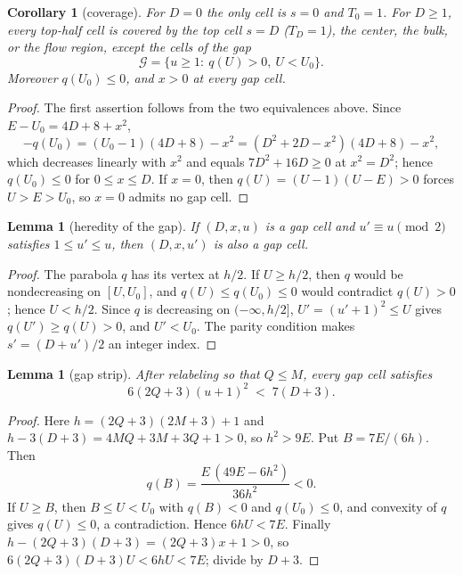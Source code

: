 \documentclass[twoside,10pt]{article}
\numberwithin{equation}{section}
\theoremstyle{slbody}
\newtheorem{lemma}[theorem]{Lemma}
\newtheorem{corollary}[theorem]{Corollary}
\theoremstyle{definition}
\theoremstyle{remark}
\numberwithin{theorem}{section}
\begin{document}
\begin{corollary}[coverage]\label{cor:coverage}
For $D=0$ the only cell is $s=0$ and $T_0=1$.  For $D\ge1$, every
top-half cell is covered by the top cell $s=D$ ($T_D=1$), the center, the
bulk, or the flow region, except the cells of the \emph{gap}
\begin{equation}\label{eq:gap}
  \mathcal G=\bigl\{u\ge1:\ q(U)>0,\ U<U_0\bigr\}.
\end{equation}
Moreover $q(U_0)\le0$, and $x>0$ at every gap cell.
\end{corollary}

\begin{proof}
The first assertion follows from the two equivalences above.  Since
$E-U_0=4D+8+x^2$,
\[
  -q(U_0)=(U_0-1)(4D+8)-x^2=(D^2+2D-x^2)(4D+8)-x^2 ,
\]
which decreases linearly with $x^2$ and equals $7D^2+16D\ge0$ at
$x^2=D^2$; hence $q(U_0)\le0$ for $0\le x\le D$.  If $x=0$, then
$q(U)=(U-1)(U-E)>0$ forces $U>E>U_0$, so $x=0$ admits no gap cell.
\end{proof}

\begin{lemma}[heredity of the gap]\label{lem:gap-heredity}
If $(D,x,u)$ is a gap cell and $u'\equiv u\pmod2$ satisfies
$1\le u'\le u$, then $(D,x,u')$ is also a gap cell.
\end{lemma}

\begin{proof}
The parabola $q$ has its vertex at $h/2$.  If $U\ge h/2$, then $q$ would be
nondecreasing on $[U,U_0]$, and $q(U)\le q(U_0)\le0$ would contradict
$q(U)>0$; hence $U<h/2$.  Since $q$ is decreasing on $(-\infty,h/2]$,
$U'=(u'+1)^2\le U$ gives $q(U')\ge q(U)>0$, and $U'<U_0$.  The parity
condition makes $s'=(D+u')/2$ an integer index.
\end{proof}

\begin{lemma}[gap strip]\label{lem:gap-strip}
After relabeling so that $Q\le M$, every gap cell satisfies
\begin{equation}\label{eq:gap-strip}
  6(2Q+3)(u+1)^2 \;<\; 7(D+3).
\end{equation}
\end{lemma}

\begin{proof}
Here $h=(2Q+3)(2M+3)+1$ and $h-3(D+3)=4MQ+3M+3Q+1>0$, so $h^2>9E$.  Put
$B=7E/(6h)$.  Then
\[
 q(B)=\frac{E\,(49E-6h^2)}{36h^2}<0 .
\]
If $U\ge B$, then $B\le U<U_0$ with $q(B)<0$ and $q(U_0)\le0$, and convexity
of $q$ gives $q(U)\le0$, a contradiction.  Hence $6hU<7E$.  Finally
$h-(2Q+3)(D+3)=(2Q+3)x+1>0$, so $6(2Q+3)(D+3)U<6hU<7E$; divide by $D+3$.
\end{proof}
\end{document}
